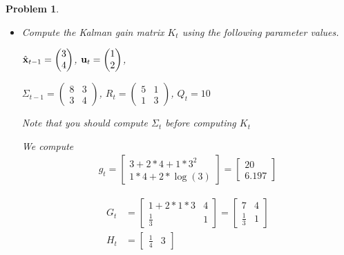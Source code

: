 \documentclass{article}
\newtheorem{problem}{Problem}
\begin{document}
\begin{problem}
\begin{itemize}
\item Compute the Kalman gain matrix $K_t$ using the following parameter values.

$\hat{\bf x}_{t-1} = \begin{pmatrix} 3 \\ 4 \end{pmatrix}$,
${\bf u}_t = \begin{pmatrix} 1 \\ 2 \end{pmatrix}$,

$\Sigma_{t-1} = \begin{pmatrix} 8 & 3 \\ 3 & 4 \end{pmatrix}$,
$R_t = \begin{pmatrix} 5 & 1 \\ 1 & 3 \end{pmatrix}$,
$Q_t = 10$

Note that you should compute $\Sigma_t$ before computing $K_t$
\begin{tcolorbox}
We compute
\begin{align*}
 g_t = \begin{bmatrix}
        3+2*4+1*3^2
        \\
        1*4+2*\log(3)
       \end{bmatrix} = \begin{bmatrix}
       20
       \\
       6.197
       \end{bmatrix}
\end{align*}

\begin{align*}
 G_t &= \begin{bmatrix}
        1+2*1*3 & 4
        \\
        \frac{1}{3} & 1
       \end{bmatrix} = \begin{bmatrix}
        7 & 4
        \\
        \frac{1}{3} & 1
       \end{bmatrix} 
    \\
 H_t &= \begin{bmatrix}
        \frac{1}{4}
        &
        3
       \end{bmatrix}
\end{align*}


\end{tcolorbox}
\end{itemize}
\end{problem}
\end{document}
